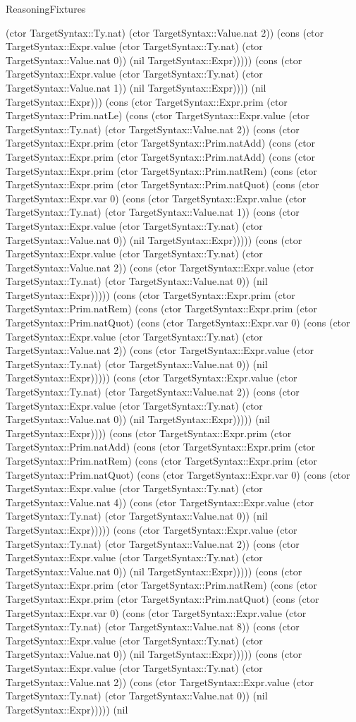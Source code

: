 \begin{lexlean}{ReasoningFixtures}
\begin{semanticmodule}
{(ctor TargetSyntax::Ty.nat) (ctor TargetSyntax::Value.nat 2)) (cons (ctor TargetSyntax::Expr.value (ctor TargetSyntax::Ty.nat) (ctor TargetSyntax::Value.nat 0)) (nil TargetSyntax::Expr))))) (cons (ctor TargetSyntax::Expr.value (ctor TargetSyntax::Ty.nat) (ctor TargetSyntax::Value.nat 1)) (nil TargetSyntax::Expr)))) (nil TargetSyntax::Expr))) (cons (ctor TargetSyntax::Expr.prim (ctor TargetSyntax::Prim.natLe) (cons (ctor TargetSyntax::Expr.value (ctor TargetSyntax::Ty.nat) (ctor TargetSyntax::Value.nat 2)) (cons (ctor TargetSyntax::Expr.prim (ctor TargetSyntax::Prim.natAdd) (cons (ctor TargetSyntax::Expr.prim (ctor TargetSyntax::Prim.natAdd) (cons (ctor TargetSyntax::Expr.prim (ctor TargetSyntax::Prim.natRem) (cons (ctor TargetSyntax::Expr.prim (ctor TargetSyntax::Prim.natQuot) (cons (ctor TargetSyntax::Expr.var 0) (cons (ctor TargetSyntax::Expr.value (ctor TargetSyntax::Ty.nat) (ctor TargetSyntax::Value.nat 1)) (cons (ctor TargetSyntax::Expr.value (ctor TargetSyntax::Ty.nat) (ctor TargetSyntax::Value.nat 0)) (nil TargetSyntax::Expr))))) (cons (ctor TargetSyntax::Expr.value (ctor TargetSyntax::Ty.nat) (ctor TargetSyntax::Value.nat 2)) (cons (ctor TargetSyntax::Expr.value (ctor TargetSyntax::Ty.nat) (ctor TargetSyntax::Value.nat 0)) (nil TargetSyntax::Expr))))) (cons (ctor TargetSyntax::Expr.prim (ctor TargetSyntax::Prim.natRem) (cons (ctor TargetSyntax::Expr.prim (ctor TargetSyntax::Prim.natQuot) (cons (ctor TargetSyntax::Expr.var 0) (cons (ctor TargetSyntax::Expr.value (ctor TargetSyntax::Ty.nat) (ctor TargetSyntax::Value.nat 2)) (cons (ctor TargetSyntax::Expr.value (ctor TargetSyntax::Ty.nat) (ctor TargetSyntax::Value.nat 0)) (nil TargetSyntax::Expr))))) (cons (ctor TargetSyntax::Expr.value (ctor TargetSyntax::Ty.nat) (ctor TargetSyntax::Value.nat 2)) (cons (ctor TargetSyntax::Expr.value (ctor TargetSyntax::Ty.nat) (ctor TargetSyntax::Value.nat 0)) (nil TargetSyntax::Expr))))) (nil TargetSyntax::Expr)))) (cons (ctor TargetSyntax::Expr.prim (ctor TargetSyntax::Prim.natAdd) (cons (ctor TargetSyntax::Expr.prim (ctor TargetSyntax::Prim.natRem) (cons (ctor TargetSyntax::Expr.prim (ctor TargetSyntax::Prim.natQuot) (cons (ctor TargetSyntax::Expr.var 0) (cons (ctor TargetSyntax::Expr.value (ctor TargetSyntax::Ty.nat) (ctor TargetSyntax::Value.nat 4)) (cons (ctor TargetSyntax::Expr.value (ctor TargetSyntax::Ty.nat) (ctor TargetSyntax::Value.nat 0)) (nil TargetSyntax::Expr))))) (cons (ctor TargetSyntax::Expr.value (ctor TargetSyntax::Ty.nat) (ctor TargetSyntax::Value.nat 2)) (cons (ctor TargetSyntax::Expr.value (ctor TargetSyntax::Ty.nat) (ctor TargetSyntax::Value.nat 0)) (nil TargetSyntax::Expr))))) (cons (ctor TargetSyntax::Expr.prim (ctor TargetSyntax::Prim.natRem) (cons (ctor TargetSyntax::Expr.prim (ctor TargetSyntax::Prim.natQuot) (cons (ctor TargetSyntax::Expr.var 0) (cons (ctor TargetSyntax::Expr.value (ctor TargetSyntax::Ty.nat) (ctor TargetSyntax::Value.nat 8)) (cons (ctor TargetSyntax::Expr.value (ctor TargetSyntax::Ty.nat) (ctor TargetSyntax::Value.nat 0)) (nil TargetSyntax::Expr))))) (cons (ctor TargetSyntax::Expr.value (ctor TargetSyntax::Ty.nat) (ctor TargetSyntax::Value.nat 2)) (cons (ctor TargetSyntax::Expr.value (ctor TargetSyntax::Ty.nat) (ctor TargetSyntax::Value.nat 0)) (nil TargetSyntax::Expr))))) (nil }
\end{semanticmodule}
\end{lexlean}
